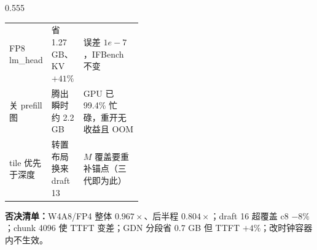 \documentclass[aspectratio=169,10pt,UTF8]{beamer}
\newcommand{\body}[1]{\par{\fontsize{8.7}{11.3}\selectfont #1}\par}
\begin{document}
\begin{frame}[t]
\begin{columns}[T,onlytextwidth]
\begin{column}{0.555\linewidth}
{\begin{tabularx}{\linewidth}{@{}>{\raggedright\arraybackslash}p{0.185\linewidth} >{\raggedright\arraybackslash}p{0.245\linewidth} X@{}}
        FP8 lm\_head & 省 1.27 GB、KV $+41\%$ & 误差 $1e{-}7$，IFBench 不变 \\
        关 prefill 图 & 腾出瞬时约 2.2 GB & GPU 已 99.4\% 忙碌，重开无收益且 OOM \\
        tile 优先于深度 & 转置布局换来 draft 13 & $M$ 覆盖要重补锚点（三代即为此） \\
        \bottomrule
      \end{tabularx}}\par
      \vspace{3pt}
      \body{\textbf{否决清单：}W4A8/FP4 整体 $0.967\times$、后半程 $0.804\times$；draft 16 超覆盖 c8 $-8\%$；chunk 4096 使 TTFT 变差；GDN 分段省 0.7 GB 但 TTFT $+4\%$；改时钟容器内不生效。\par}
    \end{column}
  \end{columns}

\end{frame}
\end{document}
